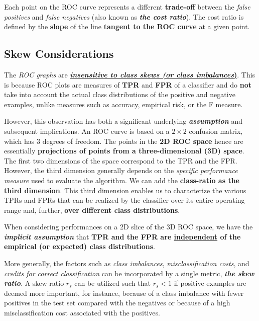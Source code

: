 \documentclass[11pt]{article}
\begin{document}
Each point on the ROC curve represents a different \textbf{trade-off} between the \emph{false positives} and \emph{false negatives} (also known as \emph{\textbf{the cost ratio}}). The cost ratio is defined by the \textbf{slope} of the line \textbf{tangent to the ROC curve} at a given point.

\subsection{Skew Considerations}

The \emph{ROC graphs} are \underline{\textbf{\emph{insensitive to class skews (or class imbalances})}}. This is because ROC plots are measures of \textbf{TPR} and \textbf{FPR} of a classifier and do \textbf{not} take into account the actual class distributions of the positive and negative examples, unlike measures such as accuracy, empirical risk, or the F measure. 

However, this observation has both a significant underlying \textit{\textbf{assumption}} and subsequent implications. An ROC curve is based on a $2 \times 2$ confusion
matrix, which has $3$ degrees of freedom. The points in the \textbf{2D ROC space} hence are essentially \textbf{projections of points from a three-dimensional (3D) space}. The first two dimensions of the space correspond to the TPR and the FPR. However, the third dimension generally depends on the \emph{specific performance measure} used to evaluate the algorithm. We can add the \textbf{class-ratio as the third dimension}. This third dimension enables us to characterize the various TPRs and FPRs that can be realized by the classifier over its entire operating range and, further, \textbf{over different class distributions}.

When considering performances on a 2D slice of the 3D ROC space, we have the \emph{\textbf{implicit assumption}} that \textbf{TPR and the FPR are \underline{independent} of the empirical (or expected) class distributions}. 

More generally, the factors such as \emph{class imbalances}, \emph{misclassification costs}, and \emph{credits for correct classification} can be incorporated by a single metric, \emph{\textbf{the skew ratio}}. A skew ratio $r_s$ can be utilized such that $r_s < 1$ if positive examples are deemed more important, for instance, because of a class imbalance with fewer positives in the test set compared with the negatives or because of a high misclassification cost associated with the positives. 
\end{document}
